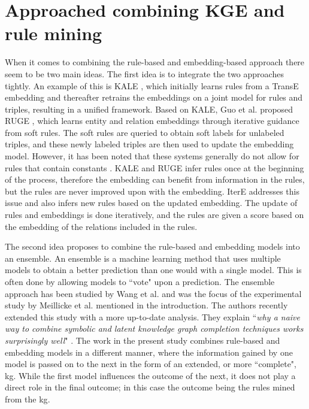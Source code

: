 \section{Approached combining KGE and rule mining}
When it comes to combining the rule-based and embedding-based approach there seem to be two main ideas. The first idea is to integrate the two approaches tightly. An example of this is KALE \cite{KALE}, which initially learns rules from a TransE embedding and thereafter retrains the embeddings on a joint model for rules and triples, resulting in a unified framework. Based on KALE, Guo et al. proposed RUGE \cite{RUGE}, which learns entity and relation embeddings through iterative guidance from soft rules. The soft rules are queried to obtain soft labels for unlabeled triples, and these newly labeled triples are then used to update the embedding model. However, it has been noted that these systems generally do not allow for rules that contain constants \cite{meilicke2021naive}. KALE and RUGE infer rules once at the beginning of the process, therefore the embedding can benefit from information in the rules, but the rules are never improved upon with the embedding. IterE \cite{zhang2019iteratively} addresses this issue and also infers new rules based on the updated embedding. The update of rules and embeddings is done iteratively, and the rules are given a score based on the embedding of the relations included in the rules.

The second idea proposes to combine the rule-based and embedding models into an ensemble. An ensemble is a machine learning method that uses multiple models to obtain a better prediction than one would with a single model. This is often done by allowing models to ``vote" upon a prediction. The ensemble approach has been studied by Wang et al. \cite{wang2018multi} and was the focus of the experimental study by Meillicke et al. \cite{ensemble} mentioned in the introduction. The authors recently extended this study with a more up-to-date analysis. They explain ``\textit{why a naive way to combine symbolic and latent knowledge graph completion techniques works surprisingly well}" \cite{meilicke2021naive}. The work in the present study combines rule-based and embedding models in a different manner, where the information gained by one model is passed on to the next in the form of an extended, or more ``complete", \gls{kg}. While the first model influences the outcome of the next, it does not play a direct role in the final outcome; in this case the outcome being the rules mined from the \gls{kg}.

